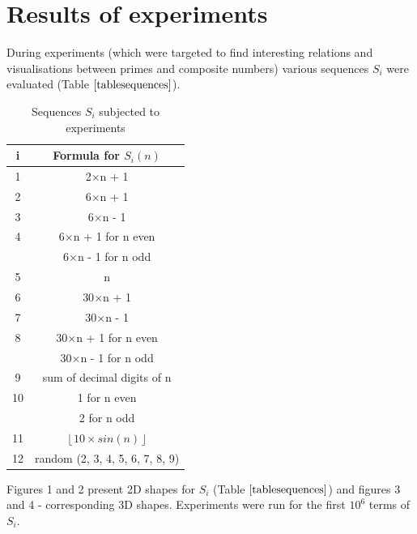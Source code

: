 \documentclass[10pt,twocolumn]{article}
\begin{document}
\section{Results of experiments}

During experiments (which were targeted to find interesting relations and visualisations between primes and composite numbers) various sequences $S_i$ were evaluated (Table $\ref{tablesequences}$).

\begin{table}[h]
\centering
\caption{Sequences $S_i$ subjected to experiments}
\label{tablesequences}
\begin{tabular}{|c|c|}
  \hline 
  \rowcolor{LightCyan}
   i & Formula for $S_i(n)$\\
  \hline 
  1 & 2$\times$n + 1 \\
  \hline 
  2 & 6$\times$n + 1 \\
  \hline 
  3 & 6$\times$n - 1 \\
  \hline 
  4 & 6$\times$n + 1 for n even \\ & 6$\times$n - 1 for n odd \\
  \hline 
  5 & n \\
  \hline 
  6 & 30$\times$n + 1 \\
  \hline 
  7 & 30$\times$n - 1 \\
  \hline 
  8 & 30$\times$n + 1 for n even \\ & 30$\times$n - 1 for n odd \\
  \hline
  9 & sum of decimal digits of n \\
  \hline 
  10 & 1 for n even \\ & 2 for n odd \\
  \hline 
  11 & $\left \lfloor{10 \times sin(n)}\right \rfloor$ \\
  \hline
  12 & random (2, 3, 4, 5, 6, 7, 8, 9) \\
  \hline
\end{tabular} 
\end{table}

Figures 1 and 2 present 2D shapes for $S_i$ (Table $\ref{tablesequences}$) and figures 3 and 4 - corresponding 3D shapes. Experiments were run for the first $10^6$ terms of $S_i$.

\onecolumn
\end{document}
